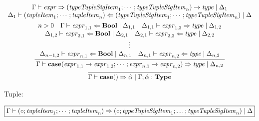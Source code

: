 \begin{gather*}
{    \begin{array}{c}
      \Gamma \vdash \mathit{expr} \Rightarrow (\mathit{typeTupleSigItem}_1; \cdots; \mathit{typeTupleSigItem}_n) \rightarrow \mathit{type} \mid \Delta_1
      \\
      \Delta_1 \vdash (\mathit{tupleItem}_1; \cdots; \mathit{tupleItem}_n) \Leftarrow (\mathit{typeTupleSigItem}_1; \cdots; \mathit{typeTupleSigItem}_n) \mid \Delta
    \end{array}
  }
  \\
  \infer{\Gamma \vdash \mathbf{case}(\mathit{expr}_{1,1} \rightarrow \mathit{expr}_{1,2}; \cdots; \mathit{expr}_{n,1} \rightarrow \mathit{expr}_{n,2}) \Rightarrow \mathit{type} \mid \Delta_{n,2}}{
    \begin{array}{c}
      n > 0
      \hspace{1em}
      \Gamma \vdash \mathit{expr}_{1,1} \Leftarrow \mathbf{Bool} \mid \Delta_{1,1}
      \hspace{1em}
      \Delta_{1,1} \vdash \mathit{expr}_{1,2} \Rightarrow \mathit{type} \mid \Delta_{1,2}
      \\
      \Delta_{1,2} \vdash \mathit{expr}_{2,1} \Leftarrow \mathbf{Bool} \mid \Delta_{2,1}
      \hspace{1em}
      \Delta_{2,1} \vdash \mathit{expr}_{2,2} \Leftarrow \mathit{type} \mid \Delta_{2,2}
      \\
      \vdots
      \\
      \Delta_{n - 1,2} \vdash \mathit{expr}_{n,1} \Leftarrow \mathbf{Bool} \mid \Delta_{n,1}
      \hspace{1em}
      \Delta_{n,1} \vdash \mathit{expr}_{n,2} \Leftarrow \mathit{type} \mid \Delta_{n,2}
    \end{array}
  }
  \\
  \infer{\Gamma \vdash \mathbf{case}() \Rightarrow \hat{\alpha} \mid \Gamma; \hat{\alpha}: \mathbf{Type}}{}
\end{gather*}

Tuple:

$\fbox{$\Gamma \vdash (\circ; \mathit{tupleItem}_1; \cdots; \mathit{tupleItem}_n) \Rightarrow (\circ; \mathit{typeTupleSigItem}_1; \ldots; \mathit{typeTupleSigItem}_n) \mid \Delta$}$

